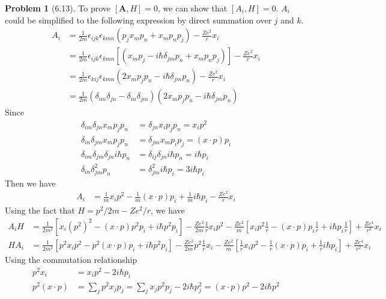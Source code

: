 \documentclass[twoside,11pt]{article}
\theoremstyle{definition}
\newtheorem{problem}{Problem}
\theoremstyle{remark}
\begin{document}
\begin{problem}[6.13]
To prove $[\mathbf{A}, H]=0$, we can show that $[A_i,H]=0$.
$A_i$ could be simplified to the following expression by direct summation
over $j$ and $k$.
\begin{align*}
    A_i &= \frac{1}{2m}\epsilon_{ijk}\epsilon_{kmn}
    (p_jx_mp_n+x_mp_np_j) - \frac{Ze^2}{r}x_i\\
    &= \frac{1}{2m}\epsilon_{ijk}\epsilon_{kmn}
    [(x_mp_j - i\hbar\delta_{jm}p_n + x_mp_np_j)] - \frac{Ze^2}{r}x_i\\
    &= \frac{1}{2m}\epsilon_{kij}\epsilon_{kmn}
    (2x_mp_jp_n - i\hbar\delta_{jm}p_n) - \frac{Ze^2}{r}x_i\\
    &= \frac{1}{2m}(\delta_{im}\delta_{jn} - \delta_{in}\delta_{jm})
    (2x_mp_jp_n - i\hbar\delta_{jm}p_n)
\end{align*}
Since
\begin{align*}
    \delta_{im}\delta_{jn}x_mp_jp_n &= \delta_{jn}x_ip_jp_n = x_ip^2\\
    \delta_{in}\delta_{jm}x_mp_jp_n &= \delta_{jm}x_mp_ip_j = (x\cdot p)p_i\\
    \delta_{im}\delta_{jm}\delta_{jn}i\hbar p_n&= 
    \delta_{ij}\delta_{jn}i\hbar p_n = i\hbar p_i\\
    \delta_{in}\delta_{jm}^2p_n &= \delta_{jm}^2 i\hbar p_i = 3i\hbar p_i
\end{align*}
Then we have 
\begin{align*}
    A_i &= \frac{1}{m}x_ip^2 - \frac{1}{m}(x\cdot p)p_i
    + \frac{1}{m}i\hbar p_i - \frac{Ze^2}{r}x_i
\end{align*}
Using the fact that $H=p^2/2m - Ze^2/r$, we have
\begin{align*}
    A_iH &=
    \frac{1}{2m^2}[x_i(p^2)^2 - (x\cdot p) p^2p_i + i\hbar p^2p_i]
    -\frac{Ze^2}{2m}\frac{1}{r}x_ip^2 - 
    \frac{Ze^2}{m}[x_ip^2\frac{1}{r} - (x\cdot p)p_i\frac{1}{r}
    +i\hbar p_i\frac{1}{r}]
    + \frac{Ze^4}{r^2}x_i\\
    HA_i &= 
    \frac{1}{2m^2}[p^2x_ip^2 - p^2(x\cdot p)p_i + i\hbar p^2p_i]
    -\frac{Ze^2}{2m}p^2\frac{1}{r}x_i 
     - \frac{Ze^2}{m}[\frac{1}{r}x_ip^2 - \frac{1}{r}(x\cdot p)p_i + 
    \frac{1}{r}i\hbar p_i]
    + \frac{Ze^4}{r^2}x_i
\end{align*}
Using the commutation relationship
\begin{align*}
    p^2 x_i &= x_ip^2 - 2i\hbar p_i\\
    p^2(x\cdot p) &= \sum_j p^2x_jp_j 
    = \sum_j x_jp^2p_j - 2i\hbar p_j^2= 
    (x\cdot p)p^2 - 2i\hbar p^2
\end{align*}

\end{problem}
\end{document}
